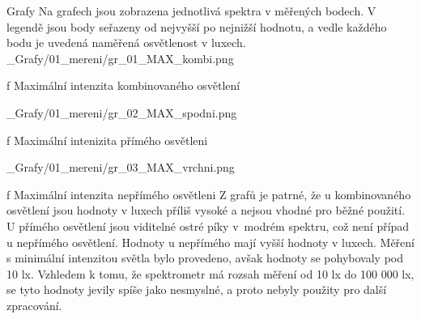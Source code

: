 \secc Grafy
Na grafech jsou zobrazena jednotlivá spektra v měřených bodech. V legendě jsou body seřazeny od nejvyšší po nejnižší hodnotu, a vedle každého bodu je uvedená naměřená osvětlenost v luxech.
\medskip {}
\picw=15cm _Grafy/01_mereni/gr_01_MAX_kombi.png
\caption/f Maximální intenzita kombinovaného osvětlení

\medskip {}
\picw=15cm _Grafy/01_mereni/gr_02_MAX_spodni.png
\caption/f Maximální intenizita přímého osvětleni

\medskip {}
\picw=15cm _Grafy/01_mereni/gr_03_MAX_vrchni.png
\caption/f Maximální intenzita nepřímého osvětleni
\medskip
Z grafů je patrné, že u kombinovaného osvětlení jsou hodnoty v luxech příliš vysoké a nejsou vhodné pro běžné použití. U přímého osvětlení jsou viditelné ostré píky v~modrém spektru, což není případ u nepřímého osvětlení. Hodnoty u nepřímého mají vyšší hodnoty v luxech.
\medskip
Měření s minimální intenzitou světla bylo provedeno, avšak hodnoty se pohybovaly pod 10 lx. Vzhledem k tomu, že spektrometr má rozsah měření od 10 lx do 100 000 lx, se tyto hodnoty jevily spíše jako nesmyslné, a proto nebyly použity pro další zpracování.

